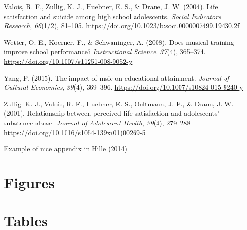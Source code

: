 \documentclass[a4, 12pt]{article}
\begin{document}
\leavevmode\hypertarget{ref-Valois2004}{}%
Valois, R. F., Zullig, K. J., Huebner, E. S., \& Drane, J. W. (2004). Life satisfaction and suicide among high school adolescents. \emph{Social Indicators Research}, \emph{66}(1/2), 81--105. \url{https://doi.org/10.1023/b:soci.0000007499.19430.2f}

\leavevmode\hypertarget{ref-Wetter2008}{}%
Wetter, O. E., Koerner, F., \& Schwaninger, A. (2008). Does musical training improve school performance? \emph{Instructional Science}, \emph{37}(4), 365--374. \url{https://doi.org/10.1007/s11251-008-9052-y}

\leavevmode\hypertarget{ref-Yang2015}{}%
Yang, P. (2015). The impact of msic on educational attainment. \emph{Journal of Cultural Economics}, \emph{39}(4), 369--396. \url{https://doi.org/10.1007/s10824-015-9240-y}

\leavevmode\hypertarget{ref-Zullig2001}{}%
Zullig, K. J., Valois, R. F., Huebner, E. S., Oeltmann, J. E., \& Drane, J. W. (2001). Relationship between perceived life satisfaction and adolescents' substance abuse. \emph{Journal of Adolescent Health}, \emph{29}(4), 279--288. \url{https://doi.org/10.1016/s1054-139x(01)00269-5}

\clearpage

\hypertarget{appendix-appendix}{%
\appendix}


Example of nice appendix in Hille (2014)

\hypertarget{figures}{%
\section{Figures}\label{figures}}

\clearpage

\hypertarget{tables}{%
\section{Tables}\label{tables}}
\end{document}
